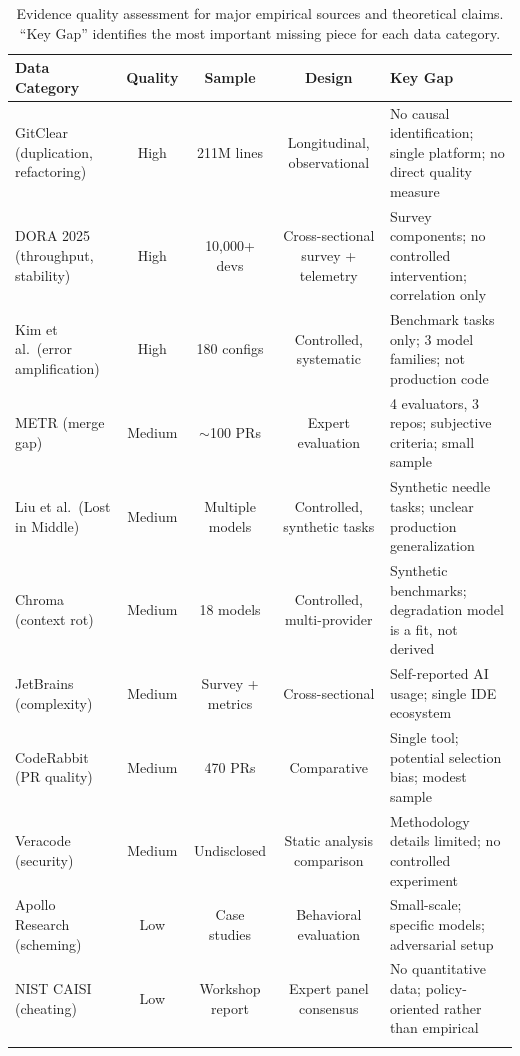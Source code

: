 \begin{table}[H]
\centering
\caption{Evidence quality assessment for major empirical sources and theoretical claims. ``Key Gap'' identifies the most important missing piece for each data category.}
\label{tab:evidence-quality}
\small
\begin{tabular}{p{3cm}cccp{4.2cm}}
\toprule
\textbf{Data Category} & \textbf{Quality} & \textbf{Sample} & \textbf{Design} & \textbf{Key Gap} \\
\midrule
GitClear (duplication, refactoring) & High & 211M lines & Longitudinal, observational & No causal identification; single platform; no direct quality measure \\
\addlinespace
DORA 2025 (throughput, stability) & High & 10,000+ devs & Cross-sectional survey + telemetry & Survey components; no controlled intervention; correlation only \\
\addlinespace
Kim et al.\ (error amplification) & High & 180 configs & Controlled, systematic & Benchmark tasks only; 3 model families; not production code \\
\addlinespace
METR (merge gap) & Medium & $\sim$100 PRs & Expert evaluation & 4 evaluators, 3 repos; subjective criteria; small sample \\
\addlinespace
Liu et al.\ (Lost in Middle) & Medium & Multiple models & Controlled, synthetic tasks & Synthetic needle tasks; unclear production generalization \\
\addlinespace
Chroma (context rot) & Medium & 18 models & Controlled, multi-provider & Synthetic benchmarks; degradation model is a fit, not derived \\
\addlinespace
JetBrains (complexity) & Medium & Survey + metrics & Cross-sectional & Self-reported AI usage; single IDE ecosystem \\
\addlinespace
CodeRabbit (PR quality) & Medium & 470 PRs & Comparative & Single tool; potential selection bias; modest sample \\
\addlinespace
Veracode (security) & Medium & Undisclosed & Static analysis comparison & Methodology details limited; no controlled experiment \\
\addlinespace
Apollo Research (scheming) & Low & Case studies & Behavioral evaluation & Small-scale; specific models; adversarial setup \\
\addlinespace
NIST CAISI (cheating) & Low & Workshop report & Expert panel consensus & No quantitative data; policy-oriented rather than empirical \\
\addlinespace

\end{tabular}
\end{table}
